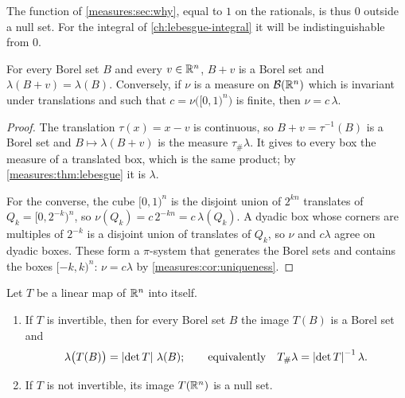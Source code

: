 \begin{notechapter}
The function of \cref{measures:sec:why}, equal to $1$ on the rationals,
is thus $0$ outside a null set. For the integral of
\cref{ch:lebesgue-integral} it will be indistinguishable from $0$.

\begin{theorem}
\label{measures:thm:translation}
For every Borel set $B$ and every $v\in\mathbb{R}^n$, $B + v$ is a Borel set and
$\lambda(B + v) = \lambda(B)$. Conversely, if $\nu$ is a measure on
$\mathcal B(\mathbb{R}^n)$ which is invariant under translations and such that
$c = \nu\bigl([0, 1)^n\bigr)$ is finite, then $\nu = c\,\lambda$.
\end{theorem}

\begin{proof}
The translation $\tau(x) = x - v$ is continuous, so
$B + v = \tau^{-1}(B)$ is a Borel set and $B\mapsto\lambda(B + v)$ is
the measure $\tau_\#\lambda$. It gives to every box the measure of a
translated box, which is the same product; by
\cref{measures:thm:lebesgue} it is $\lambda$.

For the converse, the cube $[0, 1)^n$ is the disjoint union of
$2^{kn}$ translates of $Q_k = [0, 2^{-k})^n$, so
$\nu(Q_k) = c\,2^{-kn} = c\,\lambda(Q_k)$. A dyadic box whose corners
are multiples of $2^{-k}$ is a disjoint union of translates of $Q_k$, so
$\nu$ and $c\lambda$ agree on dyadic boxes. These form a $\pi$-system
that generates the Borel sets and contains the boxes $[-k, k)^n$:
$\nu = c\lambda$ by \cref{measures:cor:uniqueness}.
\end{proof}

\begin{theorem}\label{measures:thm:linear}
Let $T$ be a linear map of $\mathbb{R}^n$ into itself.
\begin{enumerate}[nosep]
  \item If $T$ is invertible, then for every Borel set $B$ the image
        $T(B)$ is a Borel set and
        \[
          \lambda\bigl(T(B)\bigr) = \left|\det T\right|\,\lambda(B) ;
          \qquad\text{equivalently}\quad
          T_\#\lambda = \left|\det T\right|^{-1}\lambda .
        \]
  \item If $T$ is not invertible, its image $T(\mathbb{R}^n)$ is a null set.
\end{enumerate}
\end{theorem}


\end{notechapter}
